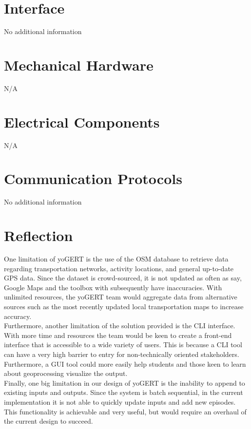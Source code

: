 \documentclass[12pt, titlepage]{article}
\begin{document}
\newpage{}

\appendix

\section{Interface}
\noindent No additional information 

\section{Mechanical Hardware}
\noindent N/A
\section{Electrical Components}
\noindent N/A
\section{Communication Protocols}
No additional information
\section{Reflection}

\noindent One limitation of yoGERT is the use of the OSM database to retrieve data regarding transportation networks, activity locations, and general up-to-date GPS data. Since the dataset is crowd-sourced, it is not updated as often as say, Google Maps and the toolbox with subsequently have inaccuracies. With unlimited resources, the yoGERT team would aggregate data from alternative sources such as the most recently updated local transportation maps to increase accuracy. \\

\noindent Furthermore, another limitation of the solution provided is the CLI interface. With more time and resources the team would be keen to create a front-end interface that is accessible to a wide variety of users. This is because a CLI tool can have a very high barrier to entry for non-technically oriented stakeholders. Furthermore, a GUI tool could more easily help students and those keen to learn about geoprocessing visualize the output.\\

\noindent Finally, one big limitation in our design of yoGERT is the inability to append to existing inputs and outputs. Since the system is batch sequential, in the current implementation it is not able to quickly update inputs and add new episodes. This functionality is achievable and very useful, but would require an overhaul of the current design to succeed. \\
\end{document}
